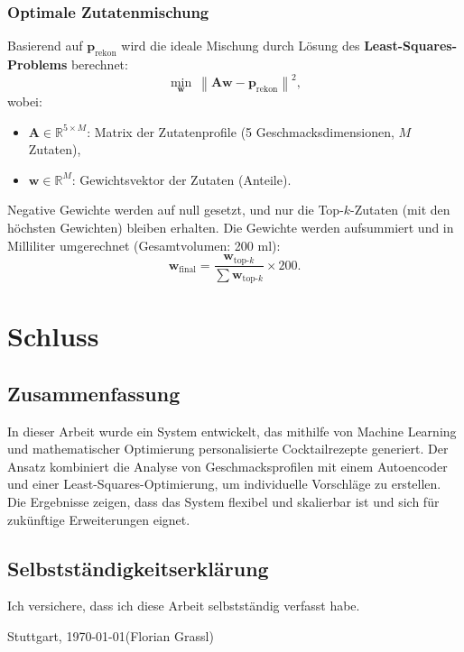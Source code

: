 \documentclass[12pt, a4paper]{report}
\begin{document}
\subsection*{Optimale Zutatenmischung}
Basierend auf \( \mathbf{p}_{\text{rekon}} \) wird die ideale Mischung durch Lösung des \textbf{Least-Squares-Problems} berechnet:
\begin{equation}
  \min_{\mathbf{w}} \ \left\lVert \mathbf{A} \mathbf{w} - \mathbf{p}_{\text{rekon}} \right\rVert^2,
\end{equation}
wobei:
\begin{itemize}
  \item \( \mathbf{A} \in \mathbb{R}^{5 \times M} \): Matrix der Zutatenprofile (5 Geschmacksdimensionen, \( M \) Zutaten),
  \item \( \mathbf{w} \in \mathbb{R}^M \): Gewichtsvektor der Zutaten (Anteile).
\end{itemize}

Negative Gewichte werden auf null gesetzt, und nur die Top-\( k \)-Zutaten (mit den höchsten Gewichten) bleiben erhalten. Die Gewichte werden aufsummiert und in Milliliter umgerechnet (Gesamtvolumen: 200 ml):
\[
\mathbf{w}_{\text{final}} = \frac{\mathbf{w}_{\text{top-}k}}{\sum \mathbf{w}_{\text{top-}k}} \times 200.
\]






\chapter{Schluss}
\section{Zusammenfassung}
In dieser Arbeit wurde ein System entwickelt, das mithilfe von Machine Learning und mathematischer Optimierung personalisierte Cocktailrezepte generiert. Der Ansatz kombiniert die Analyse von Geschmacksprofilen mit einem Autoencoder und einer Least-Squares-Optimierung, um individuelle Vorschläge zu erstellen. Die Ergebnisse zeigen, dass das System flexibel und skalierbar ist und sich für zukünftige Erweiterungen eignet.



\clearpage
\thispagestyle{empty}
\section*{Selbstständigkeitserklärung}
Ich versichere, dass ich diese Arbeit selbstständig verfasst habe.
\vspace{2cm}

\noindent
Stuttgart, \today \hfill (Florian Grassl)
\end{document}
